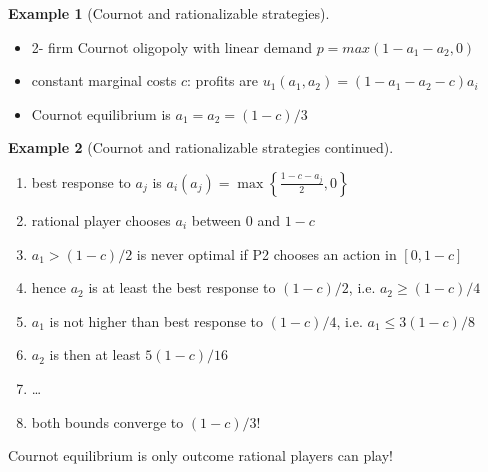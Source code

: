 \documentclass[slidestop,serif,compress]{beamer}    %
\theoremstyle{plain}
\theoremstyle{definition}
\newtheorem{ex}{Example}
\begin{document}
{\framebreak

\begin{ex}[Cournot and rationalizable strategies]\label{ex:rationalizable_cournot}
  \begin{itemize}
  \item 2- firm Cournot oligopoly with linear demand
    $p=max(1-a_1-a_2,0)$ 
  \item constant marginal costs $c$: profits are $u_1(a_1,a_2)=(1-a_1-a_2-c)a_i$
  \item Cournot equilibrium is $a_1=a_2=(1-c)/3$
  \end{itemize}
\end{ex}
\begin{ex}[Cournot and rationalizable strategies continued]
  \begin{enumerate}
  \item best response to $a_j$ is $a_i(a_j)=\max\left\{\frac{1-c-a_j}{2},0\right\}$
  \item rational player chooses $a_i$ between 0 and $1-c$
  \item $a_1 >(1-c)/2$ is never optimal if P2 chooses an action in $[0,1-c]$
  \item hence $a_2$ is at least the best response to $(1-c)/2$, i.e. $a_2\geq (1-c)/4$
  \item $a_1$ is not higher than best response to $(1-c)/4$, i.e. $a_1\leq 3(1-c)/8$
  \item $a_2$ is then at least $5(1-c)/16$
  \item \dots
  \item both bounds converge to $(1-c)/3$!
  \end{enumerate}
Cournot equilibrium is only outcome rational players can play!
\end{ex}

}
\end{document}
